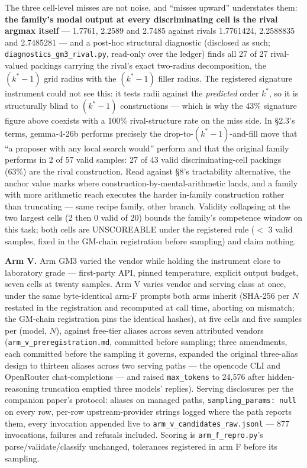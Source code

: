 The three cell-level misses are not noise, and ``misses upward'' understates them: \textbf{the
family's modal output at every discriminating cell is the rival argmax itself} --- 1.7761,
2.2589 and 2.7485 against rivals 1.7761424, 2.2588835 and 2.7485281 --- and a post-hoc
structural diagnostic (disclosed as such; \texttt{diagnostics\_gm3\_rival.py}, read-only over the
ledger) finds all 27 of 27 rival-valued packings carrying the rival's exact two-radius
decomposition, the $(k^*{-}1)$ grid radius with the $(k^*{-}1)$ filler radius. The registered
signature instrument could not see this: it tests radii against the \emph{predicted} order $k^*$,
so it is structurally blind to $(k^*{-}1)$ constructions --- which is why the 43\% signature figure
above coexists with a 100\% rival-structure rate on the miss side. In \S2.3's terms,
gemma-4-26b performs precisely the drop-to-$(k^*{-}1)$-and-fill move that ``a proposer with any
local search would'' perform and that the original family performs in 2 of 57 valid samples:
27 of 43 valid discriminating-cell packings (63\%) are the rival construction. Read against
\S8's tractability alternative, the anchor value marks where construction-by-mental-arithmetic
lands, and a family with more arithmetic reach executes the harder in-family construction
rather than truncating --- same recipe family, other branch. Validity
collapsing at the two largest cells (2 then 0 valid of 20) bounds the family's competence
window on this task; both cells are UNSCOREABLE under the registered rule ($<$ 3 valid
samples, fixed in the GM-chain registration before sampling) and claim nothing.

\textbf{Arm V.} Arm GM3 varied the vendor while holding the instrument close to laboratory grade ---
first-party API, pinned temperature, explicit output budget, seven cells at twenty samples.
Arm V varies vendor and serving class at once, under the same byte-identical arm-F prompts
both arms inherit (SHA-256 per $N$ restated in the registration and recomputed at call time,
aborting on mismatch; the GM-chain registration pins the identical hashes), at five cells and
five samples per (model, $N$), against free-tier aliases
across seven attributed vendors (\texttt{arm\_v\_preregistration.md}, committed before sampling; three amendments,
each committed before the sampling it governs, expanded the original three-alias design to
thirteen aliases across two serving paths --- the opencode CLI and OpenRouter chat-completions ---
and raised \texttt{max\_tokens} to 24,576 after hidden-reasoning truncation emptied three models'
replies). Serving disclosures per the companion paper's protocol: aliases on managed paths,
\texttt{sampling\_params: null} on every row, per-row upstream-provider strings logged where the path
reports them, every invocation appended live to \texttt{arm\_v\_candidates\_raw.jsonl} --- 877
invocations, failures and refusals included. Scoring is \texttt{arm\_f\_repro.py}'s
parse/validate/classify unchanged, tolerances registered in arm F before its sampling.

